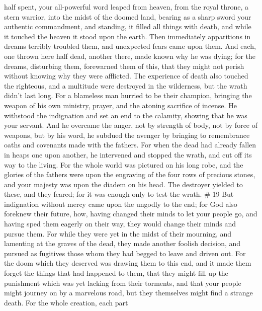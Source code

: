 half spent,  your all-powerful word leaped from heaven,
from the royal throne, a stern warrior, into the midst of the doomed
land,  bearing as a sharp sword your authentic
commandment, and standing, it filled all things with death, and while it
touched the heaven it stood upon the earth.  Then
immediately apparitions in dreams terribly troubled them, and unexpected
fears came upon them.  And each, one thrown here half
dead, another there, made known why he was dying;  for
the dreams, disturbing them, forewarned them of this, that they might
not perish without knowing why they were afflicted.  The
experience of death also touched the righteous, and a multitude were
destroyed in the wilderness, but the wrath didn't last long.
 For a blameless man hurried to be their champion,
bringing the weapon of his own ministry, prayer, and the atoning
sacrifice of incense. He withstood the indignation and set an end to the
calamity, showing that he was your servant.  And he
overcame the anger, not by strength of body, not by force of weapons,
but by his word, he subdued the avenger by bringing to remembrance oaths
and covenants made with the fathers.  For when the dead
had already fallen in heaps one upon another, he intervened and stopped
the wrath, and cut off its way to the living.  For the
whole world was pictured on his long robe, and the glories of the
fathers were upon the engraving of the four rows of precious stones, and
your majesty was upon the diadem on his head.  The
destroyer yielded to these, and they feared; for it was enough only to
test the wrath. \# 19  But indignation without mercy came
upon the ungodly to the end; for God also foreknew their future,
 how, having changed their minds to let your people go,
and having sped them eagerly on their way, they would change their minds
and pursue them.  For while they were yet in the midst of
their mourning, and lamenting at the graves of the dead, they made
another foolish decision, and pursued as fugitives those whom they had
begged to leave and driven out.  For the doom which they
deserved was drawing them to this end, and it made them forget the
things that had happened to them, that they might fill up the punishment
which was yet lacking from their torments,  and that your
people might journey on by a marvelous road, but they themselves might
find a strange death.  For the whole creation, each part

